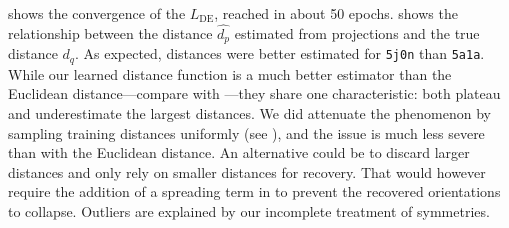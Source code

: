 shows the convergence of the $L_\text{DE}$, reached in about 50 epochs.
 shows the relationship between the distance $\widehat{d_p}$ estimated from projections and the true distance $d_q$.
As expected, distances were better estimated for \texttt{5j0n} than \texttt{5a1a}.
While our learned distance function is a much better estimator than the Euclidean distance---compare  with ---they share one characteristic: both plateau and underestimate the largest distances.
We did attenuate the phenomenon by sampling training distances uniformly (see ), and the issue is much less severe than with the Euclidean distance.
An alternative could be to discard larger distances and only rely on smaller distances for recovery.
That would however require the addition of a spreading term in  to prevent the recovered orientations to collapse.
Outliers are explained by our incomplete treatment of symmetries.

